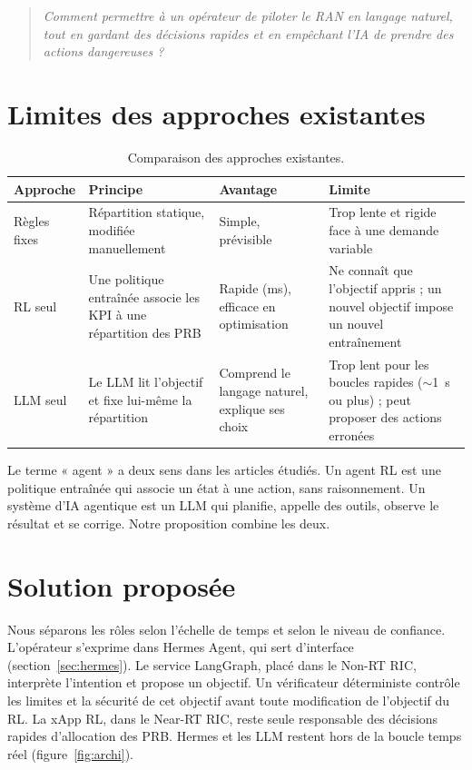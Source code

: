 \documentclass[11pt,a4paper]{article}
\begin{document}
\begin{quote}
\itshape Comment permettre à un opérateur de piloter le RAN en langage naturel, tout en
gardant des décisions rapides et en empêchant l'IA de prendre des actions dangereuses ?
\end{quote}

\section{Limites des approches existantes}

\begin{table}[H]
\centering\small
\begin{tabularx}{\textwidth}{@{}P{2.8cm}LLL@{}}
\toprule
Approche & Principe & Avantage & Limite\\
\midrule
Règles fixes & Répartition statique, modifiée manuellement & Simple, prévisible & Trop lente et rigide face à une demande variable\\
RL seul & Une politique entraînée associe les KPI à une répartition des PRB & Rapide (ms), efficace en optimisation & Ne connaît que l'objectif appris ; un nouvel objectif impose un nouvel entraînement\\
LLM seul & Le LLM lit l'objectif et fixe lui-même la répartition & Comprend le langage naturel, explique ses choix & Trop lent pour les boucles rapides ($\sim$1~s ou plus) ; peut proposer des actions erronées\\
\bottomrule
\end{tabularx}
\caption{Comparaison des approches existantes.}
\end{table}

Le terme « agent » a deux sens dans les articles étudiés. Un agent RL est une politique
entraînée qui associe un état à une action, sans raisonnement. Un système d'IA agentique
est un LLM qui planifie, appelle des outils, observe le résultat et se corrige. Notre
proposition combine les deux.

\section{Solution proposée}

Nous séparons les rôles selon l'échelle de temps et selon le niveau de confiance.
L'opérateur s'exprime dans Hermes Agent, qui sert d'interface (section~\ref{sec:hermes}).
Le service LangGraph, placé dans le Non-RT RIC, interprète l'intention et propose un
objectif. Un vérificateur déterministe contrôle les limites et la sécurité de cet objectif
avant toute modification de l'objectif du RL. La xApp RL, dans le Near-RT RIC, reste seule
responsable des décisions rapides d'allocation des PRB. Hermes et les LLM restent hors de
la boucle temps réel (figure~\ref{fig:archi}).
\end{document}
